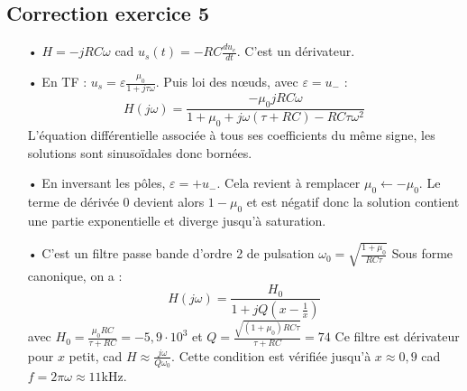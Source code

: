\documentclass{report}
\begin{document}
\subsection*{Correction exercice 5}

\begin{itemize}
	\item[•] $H = -jRC\omega$ cad $u_s(t) = -RC\frac{du_e}{dt}$. C'est un dérivateur.
	\item[•] En TF : $u_s = \varepsilon\frac{\mu_0}{1+j\tau\omega}$. Puis loi des nœuds, avec $\varepsilon=u_-$ :
	\begin{equation}
		H(j\omega) = \frac{-\mu_0jRC\omega}{1+\mu_0 + j\omega(\tau+RC)-RC\tau\omega^2}
	\end{equation}
	L'équation différentielle associée à tous ses coefficients du même signe, les solutions sont sinusoïdales donc bornées. 
	\item[•] En inversant les pôles, $\varepsilon=+u_-$. Cela revient à remplacer $\mu_0\leftarrow-\mu_0$. Le terme de dérivée 0 devient alors $1-\mu_0$ et est négatif donc la solution contient une partie exponentielle et diverge jusqu'à saturation.
	\item[•] C'est un filtre passe bande d'ordre 2 de pulsation $\omega_0=\sqrt{\frac{1+\mu_0}{RC\tau}}$
	Sous forme canonique, on a :
		\begin{equation}
		H(j\omega) = \frac{H_0}{1+jQ(x-\frac{1}{x})}
	\end{equation}
	avec $H_0=\frac{\mu_0RC}{\tau+RC}=-5,9\cdot10^3$ et $Q = \frac{\sqrt{(1+\mu_0)RC\tau}}{\tau+RC}=74$
	Ce filtre est dérivateur pour $x$ petit, cad $H\approx \frac{j\omega}{Q\omega_0}$. Cette condition est vérifiée jusqu'à $x\approx0,9$ cad $f=2\pi\omega\approx11$kHz.
\end{itemize}
\end{document}
